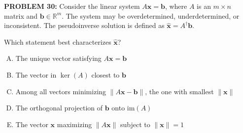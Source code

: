 \documentclass[12pt]{amsart}
\begin{document}
{%



{\bf PROBLEM 30:}
% 
Consider the linear system $A\mathbf{x} = \mathbf{b}$, where $A$ is an $m \times n$ matrix and $\mathbf{b} \in \mathbb{R}^m$. The system may be overdetermined, underdetermined, or inconsistent. The pseudoinverse solution is defined as $\hat{\mathbf{x}} = A^{\dagger}\mathbf{b}$.

Which statement best characterizes $\hat{\mathbf{x}}$?

\begin{enumerate}[(A)]
\item The unique vector satisfying $A\mathbf{x} = \mathbf{b}$
\item The vector in $\ker(A)$ closest to $\mathbf{b}$
\item Among all vectors minimizing $\|A\mathbf{x} - \mathbf{b}\|$, the one with smallest $\|\mathbf{x}\|$
\item The orthogonal projection of $\mathbf{b}$ onto $\text{im}(A)$
\item The vector $\mathbf{x}$ maximizing $\|A\mathbf{x}\|$ subject to $\|\mathbf{x}\| = 1$
\end{enumerate}


}
\end{document}
